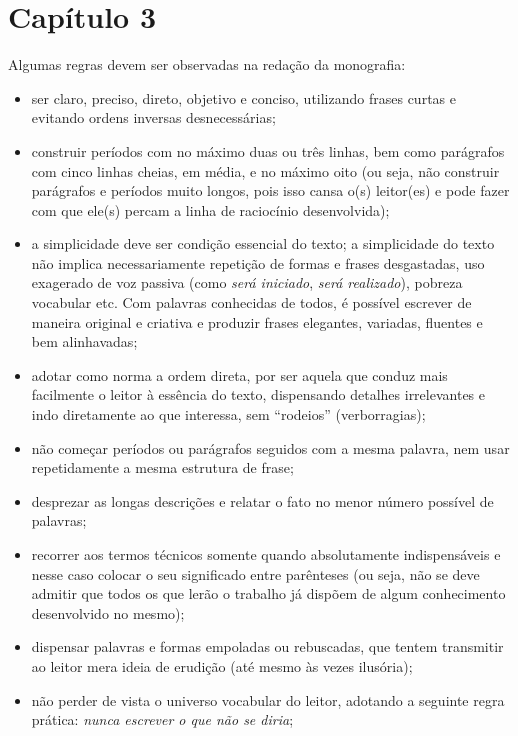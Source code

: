\chapter{Capítulo 3}

Algumas regras devem ser observadas na redação da monografia: 

\begin{itemize}
   \item ser claro, preciso, direto, objetivo e conciso, utilizando frases
   curtas e evitando ordens inversas desnecessárias;
   \item construir períodos com no máximo duas ou três linhas, bem como
   parágrafos com cinco linhas cheias, em média, e no máximo oito (ou seja, não
   construir parágrafos e períodos muito longos, pois isso cansa o(s) leitor(es)
   e pode fazer com que ele(s) percam a linha de raciocínio desenvolvida);
   \item a simplicidade deve ser condição essencial do texto; a simplicidade do
   texto não implica necessariamente repetição de formas e frases desgastadas,
   uso exagerado de voz passiva (como \textit{será iniciado}, \textit{será
   realizado}), pobreza vocabular etc. Com palavras conhecidas de todos, é
   possível escrever de maneira original e criativa e produzir frases elegantes,
   variadas, fluentes e bem alinhavadas;
   \item adotar como norma a ordem direta, por ser aquela que conduz mais
   facilmente o leitor à essência do texto, dispensando detalhes irrelevantes e
   indo diretamente ao que interessa, sem ``rodeios'' (verborragias);
   \item não começar períodos ou parágrafos seguidos com a mesma palavra, nem
   usar repetidamente a mesma estrutura de frase;
   \item desprezar as longas descrições e relatar o fato no menor número
   possível de palavras;
   \item recorrer aos termos técnicos somente quando absolutamente
   indispensáveis e nesse caso colocar o seu significado entre parênteses (ou
   seja, não se deve admitir que todos os que lerão o trabalho já dispõem de
   algum conhecimento desenvolvido no mesmo);
   \item dispensar palavras e formas empoladas ou rebuscadas, que tentem
   transmitir ao leitor mera ideia de erudição (até mesmo às vezes ilusória);
   \item não perder de vista o universo vocabular do leitor, adotando a seguinte
   regra prática: \textit{nunca escrever o que não se diria};

\end{itemize}
